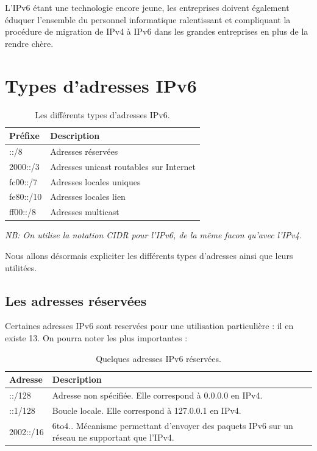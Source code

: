 L'IPv6 étant une technologie encore jeune, les entreprises doivent également éduquer l'ensemble du personnel informatique ralentissant et compliquant la procédure de migration de IPv4 à IPv6 dans les grandes entreprises en plus de la rendre chère.

\section{Types d'adresses IPv6}

\begin{table}[!h]
  \centering
  \begin{tabular}{|l|l|} 
   \hline
    \textbf{Préfixe} & \textbf{Description} \\
    \hline
    ::/8 & Adresses réservées  \\
    \hline
    2000::/3 & Adresses unicast routables sur Internet  \\
    \hline    
    fc00::/7 & Adresses locales uniques  \\
    \hline    
    fe80::/10 & Adresses locales lien  \\
    \hline    
    ff00::/8 & Adresses multicast  \\
    \hline
  \end{tabular}
  \caption{Les différents types d'adresses IPv6.}
\end{table}
\textit{NB: On utilise la notation CIDR pour l'IPv6, de la même facon qu'avec l'IPv4.}

Nous allons désormais expliciter les différents types d'adresses ainsi que leurs utilitées.

\subsection{Les adresses réservées}

Certaines adresses IPv6 sont reservées pour une utilisation particulière : il en existe 13\cite{ReservedAddress}. On pourra noter les plus importantes :
\begin{table}[!h]
  \centering
  \begin{tabular}{|l|p{15cm}|} 
   \hline
    \textbf{Adresse} & \textbf{Description} \\
    \hline
    ::/128 & Adresse non spécifiée. Elle correspond à 0.0.0.0 en IPv4.  \\
    \hline
    ::1/128 & Boucle locale. Elle correspond à 127.0.0.1 en IPv4.  \\
    \hline
    2002::/16 & 6to4.\cite{6to4}. Mécanisme permettant d'envoyer des paquets IPv6 sur un réseau ne supportant que l'IPv4. \\
    \hline
    
  \end{tabular}
  \caption{Quelques adresses IPv6 réservées.}
\end{table}


